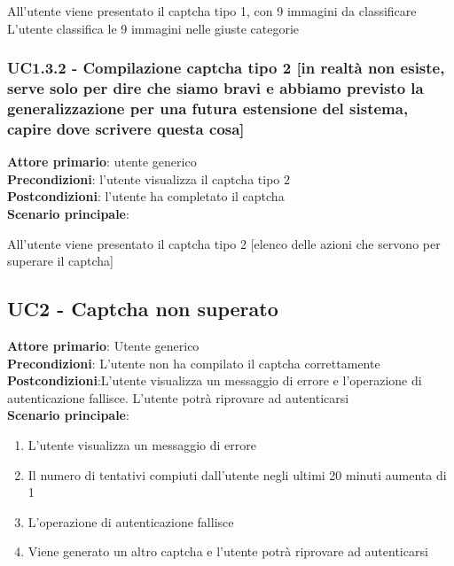 All’utente viene presentato il captcha tipo 1, con 9 immagini da classificare
L’utente classifica le 9 immagini nelle giuste categorie


\subsubsection{UC1.3.2 - Compilazione captcha tipo 2 [in realtà non esiste, serve solo per dire che siamo bravi e abbiamo previsto la generalizzazione per una futura estensione del sistema, capire dove scrivere questa cosa]}
\textbf{Attore primario}: utente generico\\
\textbf{Precondizioni}: l’utente visualizza il captcha tipo 2\\
\textbf{Postcondizioni}: l’utente ha completato il captcha\\
\textbf{Scenario principale}:

All’utente viene presentato il captcha tipo 2
[elenco delle azioni che servono per superare il captcha]

\subsection{UC2 - Captcha non superato}
\textbf{Attore primario}: Utente generico\\
\textbf{Precondizioni}: L’utente non ha compilato il captcha correttamente\\
\textbf{Postcondizioni}:L’utente visualizza un messaggio di errore e l’operazione di autenticazione fallisce. L’utente potrà riprovare ad autenticarsi\\
\textbf{Scenario principale}:
\begin{enumerate}
   \item L’utente visualizza un messaggio di errore
   \item Il numero di tentativi compiuti dall’utente negli ultimi 20 minuti aumenta di 1
   \item L’operazione di autenticazione fallisce
   \item Viene generato un altro captcha e l’utente potrà riprovare ad autenticarsi
\end{enumerate}

